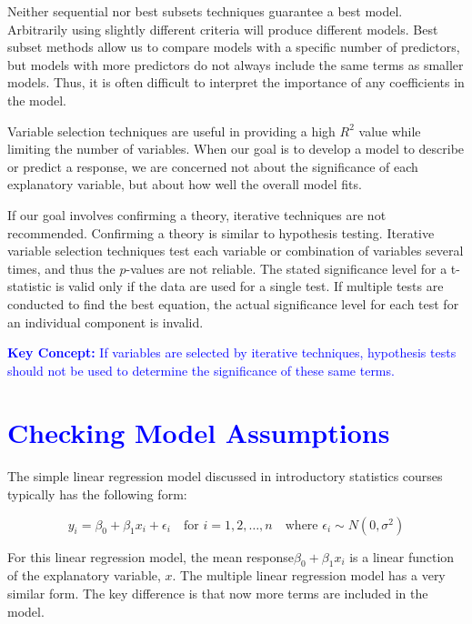 \documentclass[
]{report}
\begin{document}
Neither sequential nor best subsets techniques guarantee a best model. Arbitrarily using slightly different criteria will produce different models. Best subset methods allow us to compare models with a specific number of predictors, but models with more predictors do not always include the same terms as smaller models. Thus, it is often difficult to interpret the importance of any coefficients in the model.

Variable selection techniques are useful in providing a high \(\scriptstyle {R}^2\) value while limiting the number of variables. When our goal is to develop a model to describe or predict a response, we are concerned not about the significance of each explanatory variable, but about how well the overall model fits.

If our goal involves confirming a theory, iterative techniques are not recommended. Confirming a theory is similar to hypothesis testing. Iterative variable selection techniques test each variable or combination of variables several times, and thus the \(\scriptstyle p\)-values are not reliable. The stated significance level for a t-statistic is valid only if the data are used for a single test. If multiple tests are conducted to find the best equation, the actual significance level for each test for an individual component is invalid.

\textbf{\textcolor{blue}{Key Concept:}}
\textcolor{blue}{If variables are selected by iterative techniques, hypothesis tests should not be used to determine the significance of these same terms.}

\hypertarget{section-29}{%
\section{\texorpdfstring{\textcolor{blue}{Checking Model Assumptions}}{}}\label{section-29}}

The simple linear regression model discussed in introductory statistics courses typically has the following form:

\begin{equation}\label{slr}
y_i = \beta_0 + \beta_1 x_i + \epsilon_i \quad \text{for } i = 1, 2, \dots, n \quad \text{where } \epsilon_i \sim N(0, \sigma^2)
\tag{3.5}
\end{equation}

For this linear regression model, the mean response\(\scriptstyle \beta_0 + \beta_1x_i\) is a linear function of the explanatory variable, \(\scriptstyle x\). The multiple linear regression model has a very similar form. The key difference is that now more terms are included in the model.
\end{document}
